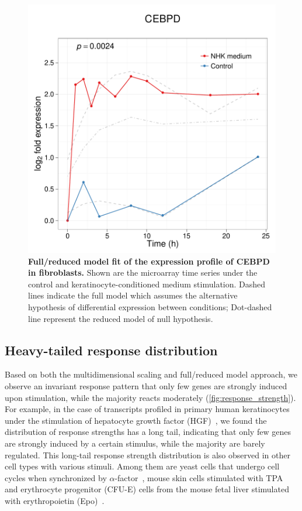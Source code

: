 \begin{figure}[!ht]
\begin{center}
\includegraphics[width=\textwidth]{hdf-fit_cebpd.pdf}
\end{center}
\caption[Full/reduced model fit of gene expression profile]{
{\bf Full/reduced model fit of the expression profile of CEBPD in fibroblasts.}
Shown are the microarray time series under the control and 
keratinocyte-conditioned medium stimulation. Dashed lines indicate the full
model which assumes the alternative hypothesis of differential expression
between conditions; Dot-dashed line represent the reduced model of null 
hypothesis.
}
\label{fig:full_reduced}
\end{figure}

\subsection{Heavy-tailed response distribution}
Based on both the multidimensional scaling and full/reduced
model approach, we observe an invariant response pattern that only few genes are strongly induced upon stimulation, while the majority reacts
moderately (\ref{fig:response_strength}). 
For example, in the case of transcripts
profiled in primary human keratinocytes under the stimulation of 
hepatocyte growth factor (HGF)~\citep{Busch2008}, we found the distribution of response
strengths has a long tail, indicating that 
only few genes are strongly induced by a certain stimulus, while the majority 
are barely regulated. This long-tail response strength
distribution is also observed in other cell types with various stimuli.
Among them are yeast cells that undergo cell cycles when synchronized by 
$\alpha$-factor~\citep{Spellman1998,Cho1998}, mouse skin cells stimulated with TPA~\citep{Riehl2010} and erythrocyte progenitor
(CFU-E) cells from the mouse fetal liver stimulated with erythropoietin (Epo)~\citep{Bachmann2011}. 

